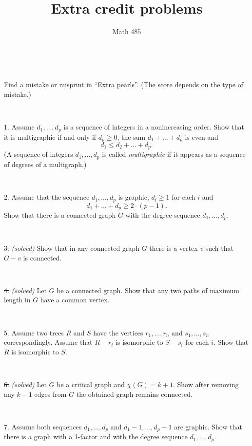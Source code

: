 \documentclass[oneside,a4paper]{article}
\begin{document}
%
\title{Extra credit problems}
\author{Math 485}
\date{}
\maketitle

\textit{}

\ 

 Find a mistake or misprint in ``Extra pearls''.
(The score depends on the type of mistake.)


\ 

\noindent %
{1.} %
Assume $d_1,\dots, d_p$ is a sequence of integers in a nonincreasing order.
Show that it is multigraphic if and only if $d_p\ge0$, the sum $d_1+\dots+ d_p$ is even and 
\[d_1\le d_2+\dots+d_p.\]
(A sequence of integers $d_1,\dots, d_p$ is called \textit{multigraphic} if it appears as a sequence of degrees of a multigraph.)

\ 

\noindent %
{2.} %
Assume that the sequence $d_1,\dots, d_p$ is graphic,
$d_i\ge 1$ for each $i$ and 
\[d_1+\dots+d_p\ge 2\cdot(p-1).\]
Show that there is a connected graph $G$ with the degree sequence $d_1,\dots, d_p$.


\ 

\noindent \sout
{3.} \textit{(solved)} 
Show that in any connected graph $G$ there is a vertex $v$ such that $G-v$ is connected.

\ 


\noindent \sout
{4.} \textit{(solved)} 
Let $G$ be a  connected graph.
Show that any two paths of maximum length in $G$ have a common vertex.

\ 

\noindent %
{5.} %
Assume two trees $R$ and $S$ 
have the vertices $r_1,\dots,r_n$ and $s_1,\dots,s_n$ correspondingly.
Assume that $R-r_i$ is isomorphic to $S-s_i$ for each $i$.
Show that $R$ is isomorphic to $S$.

\ 

\noindent \sout
{6.} \textit{(solved)}
Let $G$ be a critical graph and $\chi(G)=k+1$.
Show after removing any $k-1$ edges from $G$  
the obtained graph remains connected. 


\ 

\noindent %
{7.} %
Assume both sequences $d_1,\dots, d_p$
 and $d_1-1,\dots, d_p-1$ are graphic.
Show that there is a graph with a 1-factor and with the degree sequence $d_1,\dots, d_p$.
\end{document}
